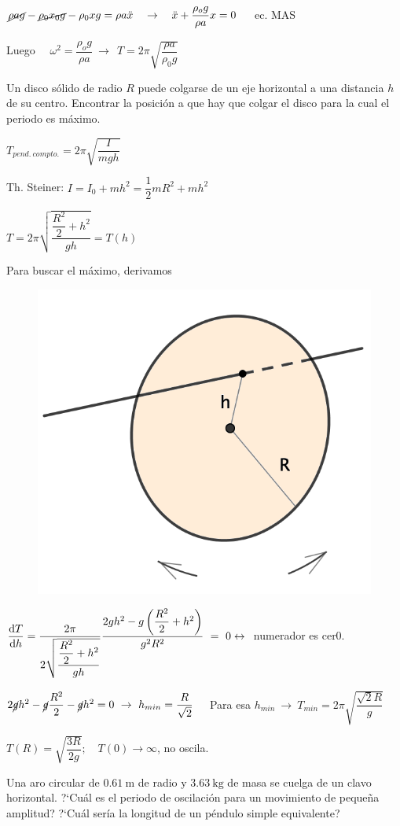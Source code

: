 $\cancel{\rho a g}-\cancel{\rho_0x_0g}-\rho_0xg=\rho a \ddot{x} \quad \to \quad \ddot{x}+\dfrac{\rho_o g}{\rho a}x=0\,\quad$ ec. MAS

Luego $\quad \omega^2=\dfrac{\rho_o g}{\rho a} \ \to \ \ T=2\pi \sqrt{\dfrac{\rho a}{\rho_0 g}}$

\vspace{5mm}%
\begin{prob}
Un disco sólido de radio $R$ puede colgarse de un eje horizontal a una distancia $h$ de su centro.	Encontrar la posición a que hay que colgar el disco para la cual el periodo es máximo. 
\end{prob}
\begin{multicols}{2}
$T_{pend.\ compto.}=2\pi \sqrt{\dfrac{I}{mgh}}$

Th. Steiner: $I=I_0+mh^2=\dfrac 1 2 m R^2+mh^2$

$T=2\pi \sqrt{\dfrac{\dfrac {R^2}{2}+h^2}{gh}}=T(h)$

Para buscar el máximo, derivamos
\begin{figure}[H]
		\centering
		\includegraphics[width=.3\textwidth]{imagenes/imagenes21/T21IM09.png}
	\end{figure}	
\end{multicols}
$\displaystyle \dv{T}{h}=
\dfrac
{2\pi}
{2 \sqrt{ \dfrac{\dfrac {R^2}{2}+h^2}{gh}} } 
\dfrac{2gh^2-g \left( \dfrac{R^2}{2} + h^2 \right) } {g^2R^2} \ = \ 0 \leftrightarrow\ $ numerador es cer0.

$2\cancel{g}h^2-\cancel{g}\dfrac{R^2}{2}-\cancel{g}h^2=0 \ \to \ h_{min}=\dfrac{R}{\sqrt{2}}\quad $ Para esa $h_{min} \ \to \ T_{min}=2\pi \sqrt{\dfrac{\sqrt{2}R}{g}}$

$T(R)=\sqrt{\dfrac{3R}{2g}}; \quad T(0)\to \infty$, no oscila.

\vspace{5mm}%
\begin{prob}
Una aro circular de $0.61\ \mathrm{m}$ de radio y $3.63\ \mathrm{kg}$ de masa se cuelga de un clavo horizontal. ?`Cuál es el periodo de oscilación para un movimiento de pequeña amplitud? ?`Cuál sería la longitud de un péndulo simple equivalente?	
\end{prob}

